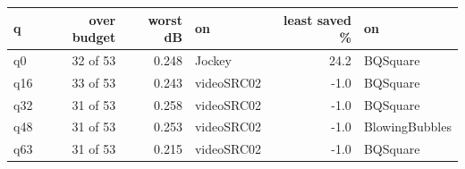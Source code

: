 \begin{tabular}{lrrlrl}
\toprule
q & over budget & worst dB & on & least saved \% & on \\
\midrule
q0 & 32 of 53 & 0.248 & Jockey & 24.2 & BQSquare \\
q16 & 33 of 53 & 0.243 & videoSRC02 & -1.0 & BQSquare \\
q32 & 31 of 53 & 0.258 & videoSRC02 & -1.0 & BQSquare \\
q48 & 31 of 53 & 0.253 & videoSRC02 & -1.0 & BlowingBubbles \\
q63 & 31 of 53 & 0.215 & videoSRC02 & -1.0 & BQSquare \\
\bottomrule
\end{tabular}

